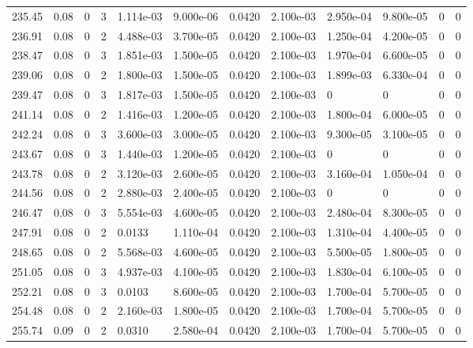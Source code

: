 \documentclass[preview]{standalone}
\begin{document}
{{{{{{{\begin{tabular}{L{1.2cm}C{1.2cm} C{0.3cm}C{0.5cm} C{1.4cm}C{1.4cm} C{1.4cm}C{1.4cm} C{1.6cm}C{1.6cm} C{1.6cm}C{1.6cm}}
  235.45  &  0.08  & 0     &  3 &  1.114e-03  & 9.000e-06  &  0.0420&   2.100e-03& 2.950e-04 & 9.800e-05   &  0 & 0  \\ 
  236.91  &  0.08  & 0     &  2 &  4.488e-03  & 3.700e-05  &  0.0420&   2.100e-03& 1.250e-04 & 4.200e-05   &  0 & 0  \\ 
  238.47  &  0.08  & 0     &  3 &  1.851e-03  & 1.500e-05  &  0.0420&   2.100e-03& 1.970e-04 & 6.600e-05   &  0 & 0  \\ 
  239.06  &  0.08  & 0     &  2 &  1.800e-03  & 1.500e-05  &  0.0420&   2.100e-03& 1.899e-03 & 6.330e-04   &  0 & 0  \\ 
  239.47  &  0.08  & 0     &  3 &  1.817e-03  & 1.500e-05  &  0.0420&   2.100e-03& 0 & 0   &  0 & 0  \\ 
  241.14  &  0.08  & 0     &  2 &  1.416e-03  & 1.200e-05  &  0.0420&   2.100e-03& 1.800e-04 & 6.000e-05   &  0 & 0  \\ 
  242.24  &  0.08  & 0     &  3 &  3.600e-03  & 3.000e-05  &  0.0420&   2.100e-03& 9.300e-05 & 3.100e-05   &  0 & 0  \\ 
  243.67  &  0.08  & 0     &  3 &  1.440e-03  & 1.200e-05  &  0.0420&   2.100e-03& 0 & 0   &  0 & 0  \\ 
  243.78  &  0.08  & 0     &  2 &  3.120e-03  & 2.600e-05  &  0.0420&   2.100e-03& 3.160e-04 & 1.050e-04   &  0 & 0  \\ 
  244.56  &  0.08  & 0     &  2 &  2.880e-03  & 2.400e-05  &  0.0420&   2.100e-03& 0 & 0   &  0 & 0  \\ 
  246.47  &  0.08  & 0     &  3 &  5.554e-03  & 4.600e-05  &  0.0420&   2.100e-03& 2.480e-04 & 8.300e-05   &  0 & 0  \\ 
  247.91  &  0.08  & 0     &  2 &  0.0133  & 1.110e-04  &  0.0420&   2.100e-03& 1.310e-04 & 4.400e-05   &  0 & 0  \\ 
  248.65  &  0.08  & 0     &  2 &  5.568e-03  & 4.600e-05  &  0.0420&   2.100e-03& 5.500e-05 & 1.800e-05   &  0 & 0  \\ 
  251.05  &  0.08  & 0     &  3 &  4.937e-03  & 4.100e-05  &  0.0420&   2.100e-03& 1.830e-04 & 6.100e-05   &  0 & 0  \\ 
  252.21  &  0.08  & 0     &  3 &  0.0103  & 8.600e-05  &  0.0420&   2.100e-03& 1.700e-04 & 5.700e-05   &  0 & 0  \\ 
  254.48  &  0.08  & 0     &  2 &  2.160e-03  & 1.800e-05  &  0.0420&   2.100e-03& 1.700e-04 & 5.700e-05   &  0 & 0  \\ 
  255.74  &  0.09  & 0     &  2 &  0.0310  & 2.580e-04  &  0.0420&   2.100e-03& 1.700e-04 & 5.700e-05   &  0 & 0  \\ 

\end{tabular}}}}}}}}
\end{document}
